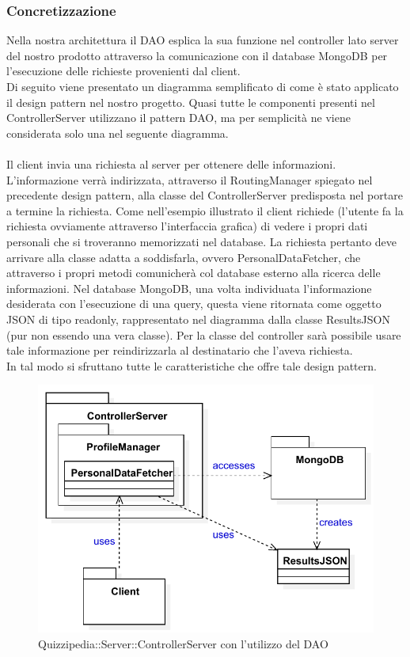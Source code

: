 \documentclass[a4paper, titlepage]{article}
\begin{document}
\subsubsection{Concretizzazione}
Nella nostra architettura il DAO esplica la sua funzione nel controller lato server del nostro prodotto attraverso la comunicazione con il database MongoDB per l'esecuzione delle richieste provenienti dal client.
\\ Di seguito viene presentato un diagramma semplificato di come è stato applicato il design pattern nel nostro progetto. Quasi tutte le componenti presenti nel ControllerServer utilizzano il pattern DAO, ma per semplicità ne viene considerata solo una nel seguente diagramma.
\\
\\ Il client invia una richiesta al server per ottenere delle informazioni. L'informazione verrà indirizzata, attraverso il RoutingManager spiegato nel precedente design pattern, alla classe del ControllerServer predisposta nel portare a termine la richiesta. 
Come nell'esempio illustrato il client richiede (l'utente fa la richiesta ovviamente attraverso l'interfaccia grafica) di vedere i propri dati personali che si troveranno memorizzati nel database. La richiesta pertanto deve arrivare alla classe adatta a soddisfarla, ovvero PersonalDataFetcher, che attraverso i propri metodi comunicherà col database esterno alla ricerca delle informazioni.
Nel database MongoDB, una volta individuata l'informazione desiderata con l'esecuzione di una query, questa viene ritornata come oggetto JSON di tipo readonly, rappresentato nel diagramma dalla classe ResultsJSON (pur non essendo una vera classe). Per la classe del controller sarà possibile usare tale informazione per reindirizzarla al destinatario che l'aveva richiesta.
\\ In tal modo si sfruttano tutte le caratteristiche che offre tale design pattern.

\begin{figure}[htp]
\centering
\includegraphics[scale=0.75]{Img/DAO.pdf}
\caption{Quizzipedia::Server::ControllerServer con l'utilizzo del DAO}
\label{}
\end{figure}
\end{document}
